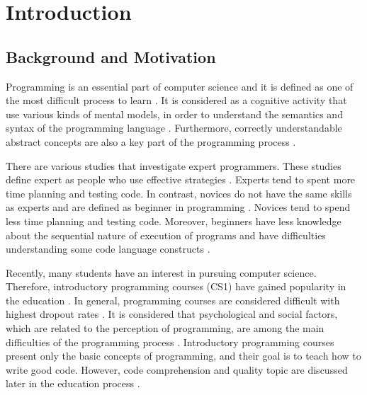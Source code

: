 %
%

\chapter{Introduction}
\label{sec:introduction}


\section{Background and Motivation}

Programming is an essential part of computer science and it is defined as one of the most difficult process to learn \cite{andrzejewska2020development}. It is considered as a cognitive activity that use various kinds of mental models, in order to understand the semantics and syntax of the programming language \cite{andrzejewska2020development}.
Furthermore, correctly understandable abstract concepts are also a key part of the programming process \cite{lahtinen2005study}.

There are various studies that investigate expert programmers. These studies define expert as people who use effective strategies \cite{robins2003learning}.   Experts tend to spent more time planning and testing code. In contrast, novices do not have the same skills as experts and are defined as beginner in programming \cite{robins2003learning}. Novices tend to spend less time planning and testing code. Moreover, beginners have less knowledge about the sequential nature of execution of programs and have difficulties understanding some code language constructs \cite{robins2003learning}.


Recently, many students have an interest in pursuing computer science. Therefore, introductory programming courses (CS1) have gained popularity in the education \cite{robins2003learning}. In general, programming courses are considered difficult with highest dropout rates \cite{robins2003learning}. It is considered that psychological and social factors, which are related to the perception of programming, are among the main difficulties of the programming process \cite{andrzejewska2020development}. Introductory programming courses present only the basic concepts of programming, and their goal is to teach how to write good code. However, code comprehension and quality topic are discussed later in the education process \cite{ inproceedings}.

